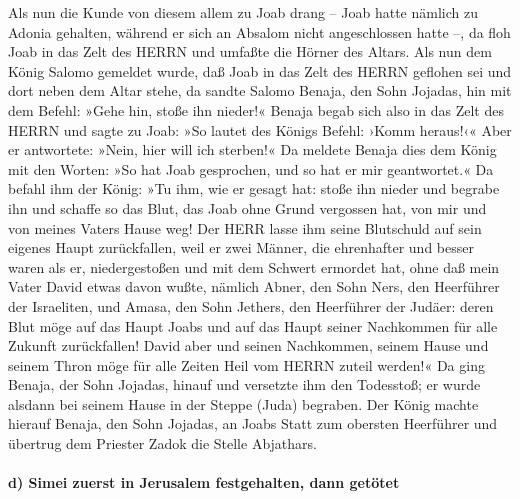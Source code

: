 Als nun die Kunde von diesem allem zu Joab drang -- Joab
hatte nämlich zu Adonia gehalten, während er sich an Absalom nicht
angeschlossen hatte --, da floh Joab in das Zelt des HERRN und umfaßte
die Hörner des Altars. Als nun dem König Salomo gemeldet
wurde, daß Joab in das Zelt des HERRN geflohen sei und dort neben dem
Altar stehe, da sandte Salomo Benaja, den Sohn Jojadas, hin mit dem
Befehl: »Gehe hin, stoße ihn nieder!« Benaja begab sich
also in das Zelt des HERRN und sagte zu Joab: »So lautet des Königs
Befehl: ›Komm heraus!‹« Aber er antwortete: »Nein, hier will ich
sterben!« Da meldete Benaja dies dem König mit den Worten: »So hat Joab
gesprochen, und so hat er mir geantwortet.« Da befahl ihm
der König: »Tu ihm, wie er gesagt hat: stoße ihn nieder und begrabe ihn
und schaffe so das Blut, das Joab ohne Grund vergossen hat, von mir und
von meines Vaters Hause weg! Der HERR lasse ihm seine
Blutschuld auf sein eigenes Haupt zurückfallen, weil er zwei Männer, die
ehrenhafter und besser waren als er, niedergestoßen und mit dem Schwert
ermordet hat, ohne daß mein Vater David etwas davon wußte, nämlich
Abner, den Sohn Ners, den Heerführer der Israeliten, und Amasa, den Sohn
Jethers, den Heerführer der Judäer: deren Blut möge auf
das Haupt Joabs und auf das Haupt seiner Nachkommen für alle Zukunft
zurückfallen! David aber und seinen Nachkommen, seinem Hause und seinem
Thron möge für alle Zeiten Heil vom HERRN zuteil werden!«
Da ging Benaja, der Sohn Jojadas, hinauf und versetzte
ihm den Todesstoß; er wurde alsdann bei seinem Hause in der Steppe
(Juda) begraben. Der König machte hierauf Benaja, den
Sohn Jojadas, an Joabs Statt zum obersten Heerführer und übertrug dem
Priester Zadok die Stelle Abjathars.

\hypertarget{d-simei-zuerst-in-jerusalem-festgehalten-dann-getuxf6tet}{%
\paragraph{d) Simei zuerst in Jerusalem festgehalten, dann
getötet}\label{d-simei-zuerst-in-jerusalem-festgehalten-dann-getuxf6tet}}

